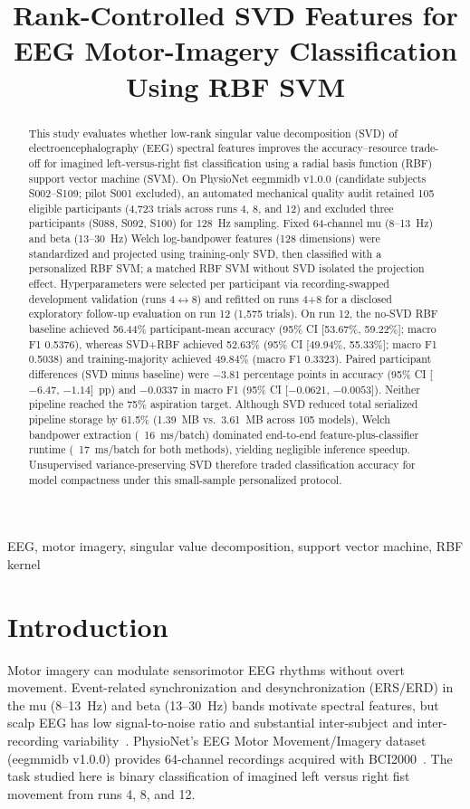 \documentclass[conference]{IEEEtran}
\title{Rank-Controlled SVD Features for EEG Motor-Imagery Classification Using RBF SVM}
\author{\IEEEauthorblockN{[Student names and USNs]}
\IEEEauthorblockA{[Department and institution]\\Faculty: Dr Geetha KN\\{[Academic year]}}}
\begin{document}
\maketitle
\begin{abstract}
This study evaluates whether low-rank singular value decomposition (SVD) of
electroencephalography (EEG) spectral features improves the accuracy--resource
trade-off for imagined left-versus-right fist classification using a radial basis
function (RBF) support vector machine (SVM). On PhysioNet eegmmidb v1.0.0
(candidate subjects S002--S109; pilot S001 excluded), an automated mechanical
quality audit retained 105 eligible participants (4,723 trials across runs 4, 8,
and 12) and excluded three participants (S088, S092, S100) for 128~Hz sampling.
Fixed 64-channel mu (8--13~Hz) and beta (13--30~Hz) Welch log-bandpower features
(128 dimensions) were standardized and projected using training-only SVD, then
classified with a personalized RBF SVM; a matched RBF SVM without SVD isolated
the projection effect. Hyperparameters were selected per participant via
recording-swapped development validation (runs 4$\leftrightarrow$8) and refitted
on runs 4+8 for a disclosed exploratory follow-up evaluation on run 12 (1,575
trials). On run 12, the no-SVD RBF baseline achieved 56.44\% participant-mean
accuracy (95\% CI [53.67\%, 59.22\%]; macro F1 0.5376), whereas SVD+RBF
achieved 52.63\% (95\% CI [49.94\%, 55.33\%]; macro F1 0.5038) and
training-majority achieved 49.84\% (macro F1 0.3323). Paired participant
differences (SVD minus baseline) were $-3.81$ percentage points in accuracy
(95\% CI [$-6.47$, $-1.14$]~pp) and $-0.0337$ in macro F1 (95\% CI [$-0.0621$,
$-0.0053$]). Neither pipeline reached the 75\% aspiration target. Although SVD
reduced total serialized pipeline storage by 61.5\% (1.39~MB vs.\ 3.61~MB across
105 models), Welch bandpower extraction (~16~ms/batch) dominated end-to-end
feature-plus-classifier runtime (~17~ms/batch for both methods), yielding
negligible inference speedup. Unsupervised variance-preserving SVD therefore
traded classification accuracy for model compactness under this small-sample
personalized protocol.
\end{abstract}
\begin{IEEEkeywords}
EEG, motor imagery, singular value decomposition, support vector machine, RBF kernel
\end{IEEEkeywords}

\section{Introduction}
Motor imagery can modulate sensorimotor EEG rhythms without overt movement.
Event-related synchronization and desynchronization (ERS/ERD) in the mu
(8--13~Hz) and beta (13--30~Hz) bands motivate spectral features, but scalp EEG
has low signal-to-noise ratio and substantial inter-subject and inter-recording
variability~\cite{ref3}. PhysioNet's EEG Motor Movement/Imagery dataset
(eegmmidb v1.0.0) provides 64-channel recordings acquired with BCI2000~\cite{ref1}.
The task studied here is binary classification of imagined left versus right fist
movement from runs 4, 8, and 12.
\end{document}
